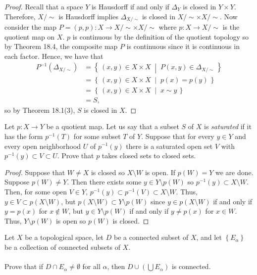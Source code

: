 \begin{proof}
Recall that a space $Y$ is Hausdorff if and only if $\Delta_Y$ is
closed in $Y\times Y$. Therefore, $X/{\sim}$ is Hausdorff implies
$\Delta_{X/{\sim}}$ is closed in $X/{\sim}\times X/{\sim}$. Now
consider the map $P=(p,p)\colon X\to X/{\sim}\times
X/{\sim}$ where $p\colon X\to X/{\sim}$ is the quotient map on
$X$. $p$ is continuous by the definition of the quotient topology
so by Theorem 18.4, the composite map $P$ is continuous since it
is continuous in each factor. Hence, we have that
\begin{align*}
P^{-1}(\Delta_{X/{\sim}})
&=
\left\{\,(x,y)\in X\times X\;\middle|\;P(x,y)\in\Delta_{X/{\sim}}\,\right\}\\
&=
\left\{\,(x,y)\in X\times X\;\middle|\;p(x)=p(y)\,\right\}\\
&=
\left\{\,(x,y)\in X\times X\;\middle|\;x\sim y\,\right\}\\
&=S,
\end{align*}
so by Theorem 18.1(3), $S$ is closed in $X$.
\end{proof}
\begin{problem}
Let $p\colon X\to Y$ be a quotient map. Let us say that a subset
$S$ of $X$ is \emph{saturated} if it has the form $p^{-1}(T)$ for
some subset $T$ of $Y$. Suppose that for every $y\in Y$ and every
open neighborhood $U$ of $p^{-1}(y)$ there is a saturated open
set $V$ with $p^{-1}(y)\subset V\subset U$. Prove that $p$ takes
closed sets to closed sets.
\end{problem}
\begin{proof}
Suppose that $W\neq X$ is closed so $X\setminus W$ is open. If
$p(W)=Y$ we are done. Suppose $p(W)\neq Y$. Then there exists
some $y\in Y\setminus p(W)$ so $p^{-1}(y)\subset X\setminus
W$. Then, for some open $V\in Y$, $p^{-1}(y)\subset
p^{-1}(V)\subset X\setminus W$. Thus, $y\in V\subset p(X\setminus
W)$, but $p(X\setminus W)\subset Y\setminus p(W)$ since $y\in
p(X\setminus W)$ if and only if $y=p(x)$ for $x\notin W$, but
$y\in Y\setminus p(W)$ if and only if $y\neq p(x)$ for $x\in
W$. Thus, $Y\setminus p(W)$ is open so $p(W)$ is closed.
\end{proof}
\begin{problem}
Let $X$ be a topological space, let $D$ be a connected subset of
$X$, and let $\left\{E_\alpha\right\}$ be a collection of
connected subsets of $X$.
\\\\
Prove that if $D\cap E_\alpha\neq\emptyset$ for all $\alpha$,
then $D\cup\left(\bigcup E_\alpha\right)$ is connected.
\end{problem}
